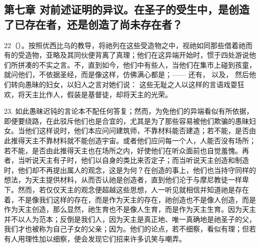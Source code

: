 
\subsection{第七章 对前述证明的异议。在圣子的受生中，是创造了已存在者，还是创造了尚未存在者？}

22（）。按照优西比乌的教导，将祂列在这些受造物之中，视祂如同那些借着祂而有的受造物，亚略及其同伙便背离了真理；他们在这异端开始时，惯于四处游说他们所拼凑的不实之言。不，直到如今，他们中有些人，当他们在集市上碰到孩童，就问他们，不依据圣经，而是像这样，仿佛满心都是；——  还有， 以及， 然后他们转向愚昧的妇女，以妇人之言对她们说： 这些无耻之人以这样的言语戏耍狂欢，将天主比作人，假装是基督徒，却将天主的光荣。\par

23. 如此愚昧迟钝的言论本不配任何答复；然而，为免他们的异端看似有所依据，即便要绕路，在此驳斥他们也是合宜的，尤其是为了那些容易被他们欺骗的愚昧妇女。当他们这样说时，他们本应问问建筑师，不靠材料能否建造；若不能，是否由此推得天主不靠材料就不能创造宇宙。或者他们应问每一个人，人能否没有场所；若不能，是否由此推得天主也在场所之内，好使他们在听众面前也自觉羞愧。再者，当听说天主有子时，他们以自身的类比来否定子；而当听说天主创造和制造时，他们却不再提出属人的观念，这是为何？在创造的事上，他们也当持守同样的想法，为天主提供材料，从而否认祂是创造者，直到他们沦于与摩尼教徒一样卑下。然而，若仅仅天主的观念便超越这些思想，人一听见就相信并知道祂是存在着，不是像我们这样的存在，而是作为天主的存在，祂创造也不是像人创造，而是作为天主创造，那么显然，祂生育也不是像人生育，而是作为天主生育。因为天主并不以人为范本；反倒是我们人，因为天主是真正地、唯一真确地是祂圣子的父，我们才也被称为自己子女的父亲；因为。他们的论点，若不细察，看似有理；但若有人用理性加以细察，便会发现它们招来许多讥笑与嘲弄。\par

